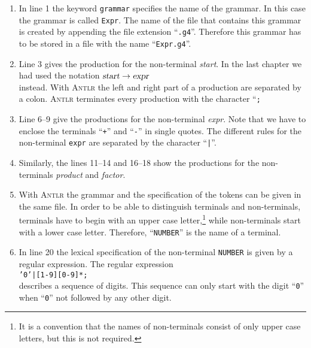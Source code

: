 \begin{enumerate}
\item In line 1 the keyword \texttt{grammar} specifies the name of the grammar.
      In this case the grammar is called \texttt{Expr}.  The name of the file that contains this grammar is
      created by appending the file extension  ``\texttt{.g4}''.  Therefore this grammar 
      has to be stored in a file with the name ``\texttt{Expr.g4}''.
\item Line 3 gives the production for the non-terminal \textsl{start}.  In the last chapter we had used the
      notation
      \hspace*{1.3cm}
      $\textsl{start} \rightarrow \textsl{expr}$
      \\[0.2cm]
      instead.  With \textsc{Antlr} the left and right part of a production are separated by a colon.
      \textsc{Antlr} terminates every production with the character ``\texttt{;}
\item Line 6--9 give the productions for the non-terminal \textsl{expr}.  Note that we have to enclose the 
      terminals ``\texttt{+}'' and ``\texttt{-}'' in single quotes.  The different rules for the non-terminal
      \texttt{expr} are separated by the character ``\texttt{|}''.
\item Similarly, the lines 11--14 and 16--18 show the productions for the non-terminals \textsl{product} and
      \textsl{factor}.   
\item With \textsc{Antlr} the grammar and the specification of the tokens can be given in the same file.
      In order to be able to distinguish terminals and non-terminals, terminals have to begin with an upper case 
      letter,\footnote
      {It is a convention that the names of non-terminals consist of only upper case letters, but this is not required.}
      while non-terminals start with a lower case letter.   Therefore, ``\texttt{NUMBER}'' is the name
      of a terminal.
\item In line 20 the lexical specification of the non-terminal \texttt{NUMBER} is given
      by a regular expression.  The regular expression
      \\[0.2cm]
      \hspace*{1.3cm}
      \texttt{'0'|[1-9][0-9]*;}
      \\[0.2cm]
      describes a sequence of digits.  This sequence can only start with the digit
      ``\texttt{0}'' when ``\texttt{0}'' not followed by any other digit.


\end{enumerate}
